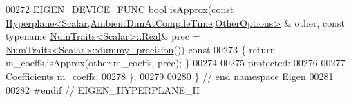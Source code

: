 \begin{DoxyCode}
\hyperlink{group___geometry___module_a544f8466e85e4b95e1848dccf6015d23}{00272}   EIGEN\_DEVICE\_FUNC \textcolor{keywordtype}{bool} \hyperlink{group___geometry___module_a544f8466e85e4b95e1848dccf6015d23}{isApprox}(\textcolor{keyword}{const} 
      \hyperlink{group___geometry___module_class_eigen_1_1_hyperplane}{Hyperplane<Scalar,AmbientDimAtCompileTime,OtherOptions>}
      & other, \textcolor{keyword}{const} \textcolor{keyword}{typename} \hyperlink{group___core___module_struct_eigen_1_1_num_traits}{NumTraits<Scalar>::Real}& prec = 
      \hyperlink{group___core___module_struct_eigen_1_1_num_traits}{NumTraits<Scalar>::dummy\_precision}())\textcolor{keyword}{ const}
00273 \textcolor{keyword}{  }\{ \textcolor{keywordflow}{return} m\_coeffs.isApprox(other.m\_coeffs, prec); \}
00274 
00275 \textcolor{keyword}{protected}:
00276 
00277   Coefficients m\_coeffs;
00278 \};
00279 
00280 \} \textcolor{comment}{// end namespace Eigen}
00281 
00282 \textcolor{preprocessor}{#endif // EIGEN\_HYPERPLANE\_H}
\end{DoxyCode}
